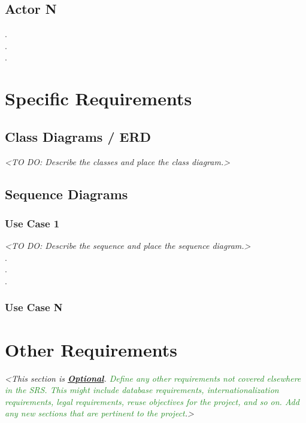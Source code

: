 \documentclass[12pt,a4paper]{report}
\begin{document}
\section{Actor N}
\hspace*{1.5cm} . \\
\hspace*{1.5cm} . \\
\hspace*{1.5cm} .

\chapter{Specific Requirements}
\section{Class Diagrams / ERD}
\textit{<TO DO: Describe the classes and place the class diagram.>}

\section{Sequence Diagrams}
\subsection{Use Case 1}
\textit{<TO DO: Describe the sequence and place the sequence diagram.>} \\
\hspace*{3cm} . \\
\hspace*{3cm} . \\
\hspace*{3cm} . 
\subsection{Use Case N}

\chapter{Other Requirements}
\textit{<This section is \underline{\textbf{Optional}}. \textcolor{ForestGreen}{Define any other requirements not covered elsewhere in the SRS. This
might include database requirements, internationalization requirements, legal requirements, reuse
objectives for the project, and so on. Add any new sections that are pertinent to the project}.>}
\end{document}
